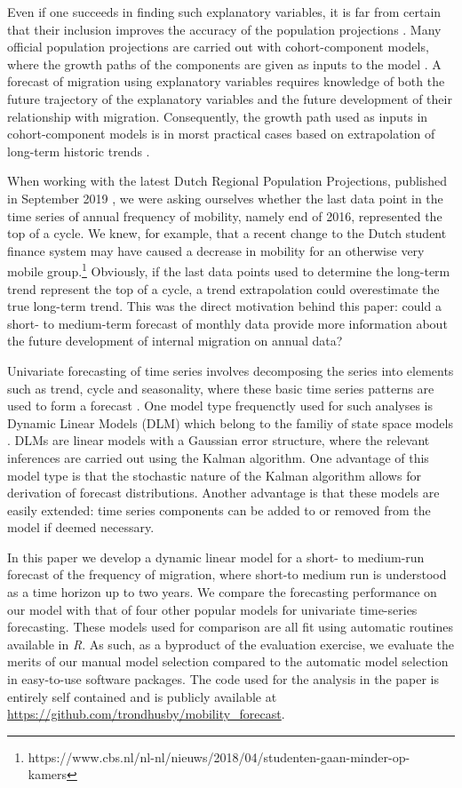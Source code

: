 \documentclass[12pt, a4paper]{article}
\begin{document}
Even if one succeeds in finding such explanatory variables, it is far from certain that  their inclusion improves the accuracy of the population projections \citep{smith1997further}. Many official population projections are carried out with cohort-component
models, where the growth paths of the components are given as inputs to
the model \citep[see e.g., ][]{de2005achtergronden}. A forecast of migration using explanatory variables requires knowledge of both the future trajectory of the explanatory variables and the future development of their relationship with migration.
Consequently, the growth path used as inputs in
cohort-component models is in morst practical cases based on extrapolation of
long-term historic trends \citep{smith2013practitioner}.

When working with the latest Dutch Regional Population Projections,
published in September 2019 \citep{teriele2019}, we were asking ourselves
whether the last data point in the time series of annual frequency of
mobility, namely end of 2016, represented the top of a
cycle. We knew, for example, that a recent change to the Dutch student
finance system may have caused a decrease in mobility for an
otherwise very mobile
group.\footnote{https://www.cbs.nl/nl-nl/nieuws/2018/04/studenten-gaan-minder-op-kamers}
 Obviously, if the last data points used to determine
the long-term trend represent the top of a cycle, a trend extrapolation
could overestimate the true long-term trend. This was the direct motivation behind this paper: could a short- to medium-term forecast of monthly data provide more information about the future development of internal migration on annual data?

Univariate forecasting of time series involves decomposing the series into elements such as trend, cycle and seasonality, where these basic time series patterns are used to form a forecast \citep{zietz2014us}. One model type frequenctly used for such analyses is Dynamic Linear Models (DLM) which belong to the familiy of state space models \citep{petris2009dynamic, durbin2012time}. DLMs are linear models with a Gaussian error structure, where the relevant inferences are carried out using the Kalman algorithm. One advantage of this model type is that the stochastic nature of the Kalman algorithm allows for derivation of forecast distributions. Another advantage is that these models are easily extended: time series components can be added to or removed from the model if deemed necessary. 

In this paper we develop a dynamic linear model for a short- to medium-run forecast of the frequency of migration, where short-to medium run is understood as a time horizon up to two years. We compare the forecasting performance on our model with that of four other popular models for univariate time-series
forecasting. These models used for comparison are all fit using automatic routines available
in \emph{R}. As such, as a byproduct of the evaluation exercise, we
evaluate the merits of our manual model selection compared to the
automatic model selection in easy-to-use software packages. The code used for the analysis in the paper is entirely self contained and is publicly available at \url{https://github.com/trondhusby/mobility_forecast}.
\end{document}
